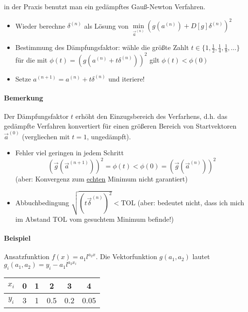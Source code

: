 \documentclass[a4paper,ngerman]{scrbook}
\newcommand{\un}[2]{\ensuremath{#1^{(#2)}}}%
\begin{document}

in der Praxis benutzt man ein gedämpftes Gauß-Newton Verfahren.
\begin{itemize}
\item Wieder berechne $\un{\delta}{n}$ als Lösung von $\min\limits_{\un{\vec{a}}{n}} \left( g\left(\un{a}{n}\right) + D\left[g\right] \un{\delta}{n}\right)^2$
\item Bestimmung des Dämpfungsfaktor: wähle die größte Zahlt $t \in \{ 1, \frac{1}{2}, \frac{1}{4}, \frac{1}{8}, \dots \}$ für die mit $\phi(t) = \left( g\left( \un{a}{n} + t\un{\delta}{n}\right)\right)^2$ gilt $\phi(t) < \phi(0)$
\item Setze $\un{a}{n+1} = \un{a}{n} + t \un{\delta}{n}$ und iteriere!
\end{itemize}

\paragraph{Bemerkung}

Der Dämpfungsfaktor $t$ erhöht den Einzugsbereich des Verfarhens, d.h\@. das gedämpfte Verfahren konvertiert für einen größeren Bereich von Startvektoren \un{\vec{a}}{0} (vergliechen mit $t=1$, ungedämpft).

\begin{itemize}
\item Fehler viel geringen in jedem Schritt
\[
\left(\vec{g}\left(\un{\vec{a}}{n+1}\right)\right)^2 = \phi(t) < \phi(0) = \left(\vec{g}\left(\un{\vec{a}}{n}\right)\right)^2
\]
(aber: Konvergenz zum \underline{echten} Minimum nicht garantiert)
\item Abbuchbedingung $\sqrt{\left(t\un{\vec{\delta}}{n}\right)^2} < \text{TOL}$ (aber: bedeutet nicht, dass ich mich im Abstand TOL vom gesuchtem Minimum befinde!)
\end{itemize}

\paragraph{Beispiel}

Ansatzfunktion $f(x) = a_1 l^{a_2x}$. Die Vektorfunktion $g(a_1,a_2)$ lautet $g_i(a_1,a_2) = y_i - a_1 l^{a_2x_i}$

\begin{tabular}{c|ccccc}
  $x_i$ & 0 & 1 & 2 & 3 & 4\\\hline
  $y_i$ & 3 & 1 & 0.5 & 0.2 & 0.05
\end{tabular}
\end{document}
